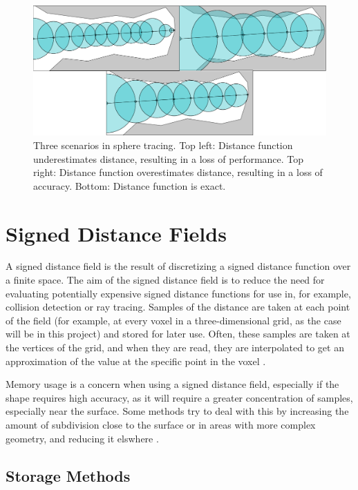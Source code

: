 \newpage

\begin{figure} [ht]
	\centering
	\includegraphics[width=0.75\linewidth, frame]{Images/Sphere-Tracing.png}
	\caption{Three scenarios in sphere tracing. Top left: Distance function underestimates distance, resulting in a loss of performance. Top right: Distance function overestimates distance, resulting in a loss of accuracy. Bottom: Distance function is exact.}
	\label{figure:sphere-tracing}
\end{figure}

\section{Signed Distance Fields}

A signed distance field is the result of discretizing a signed distance function over a finite space. The aim of the signed distance field is to reduce the need for evaluating potentially expensive signed distance functions for use in, for example, collision detection or ray tracing. Samples of the distance are taken at each point of the field (for example, at every voxel in a three-dimensional grid, as the case will be in this project) and stored for later use. Often, these samples are taken at the vertices of the grid, and when they are read, they are interpolated to get an approximation of the value at the specific point in the voxel \cite{koschier2016hierarchical}.\newline

Memory usage is a concern when using a signed distance field, especially if the shape requires high accuracy, as it will require a greater concentration of samples, especially near the surface. Some methods try to deal with this by increasing the amount of subdivision close to the surface or in areas with more complex geometry, and reducing it elswhere \cite{frisken2000adaptively}.\newline

\subsection{Storage Methods}

